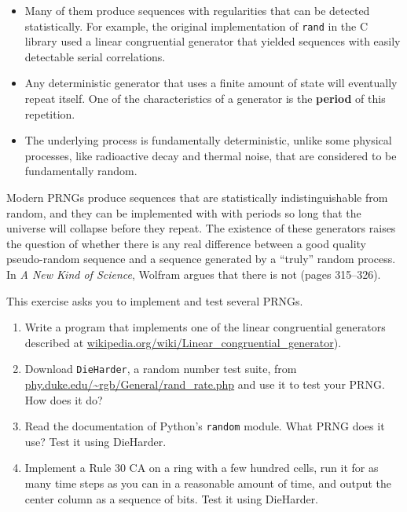 \documentclass[10pt]{book}
\begin{document}
\begin{itemize}

\item Many of them produce sequences with regularities that
can be detected statistically.  For example, the original implementation
of {\tt rand} in the C library used a linear congruential generator
that yielded sequences with easily detectable serial correlations.

\item Any deterministic generator that uses a finite amount
of state will eventually repeat itself.  One of the
characteristics of a generator is the {\bf period} of this
repetition.

\item The underlying process is fundamentally deterministic,
unlike some physical processes, like radioactive decay and
thermal noise, that are considered to be fundamentally
random.

\end{itemize}

Modern PRNGs produce sequences that are statistically
indistinguishable from random, and they can be implemented with with
periods so long that the universe will collapse before they repeat.
The existence of these generators raises the question of whether there
is any real difference between a good quality pseudo-random sequence
and a sequence generated by a ``truly'' random process.  In {\em A New
  Kind of Science}, Wolfram argues that there is not (pages 315--326).

\begin{ex}

This exercise asks you to implement and test several PRNGs.

\begin{enumerate}

\item Write a program that implements one of the linear congruential
generators described at
\url{wikipedia.org/wiki/Linear_congruential_generator}).

\item Download {\tt DieHarder}, a random number test suite, from
\url{phy.duke.edu/~rgb/General/rand_rate.php} and use it to
test your PRNG.  How does it do?

\item Read the documentation of Python's {\tt random} module.
What PRNG does it use?  Test it using DieHarder.

\item Implement a Rule 30 CA on a ring with a few hundred cells,
run it for as many time steps as you can in a reasonable amount
of time, and output the center column as a sequence of bits.
Test it using DieHarder.

\end{enumerate}

\end{ex}
\end{document}
